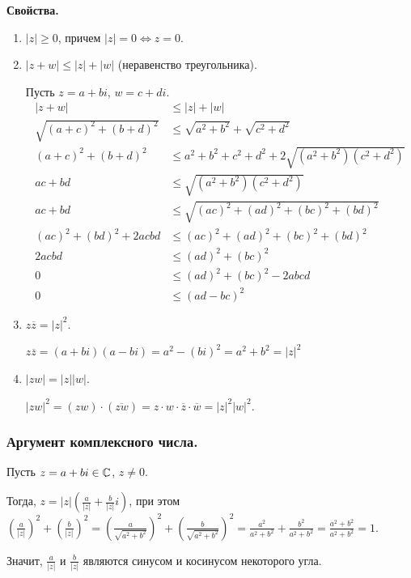 \textbf{Свойства.}

\begin{enumerate}[label={\arabic*°.}]
    \item $|z| \geq 0$, причем $|z| = 0 \iff z = 0$.
    \item $|z + w| \leq |z| + |w|$ (неравенство треугольника).

    Пусть $z = a + bi$, $w = c + di$.
    \begin{align*}
        |z + w| &\leq |z| + |w| \\
        \sqrt{(a + c)^2 + (b + d)^2} &\leq \sqrt{a^2 + b^2} + \sqrt{c^2 + d^2} \\
        (a + c)^2 + (b + d)^2 &\leq a^2 + b^2 + c^2 + d^2 + 2\sqrt{(a^2 + b^2)(c^2 + d^2)} \\
        ac + bd &\leq\sqrt{(a^2 + b^2)(c^2 + d^2)} \\
        ac + bd &\leq\sqrt{(ac)^2 + (ad)^2 + (bc)^2 + (bd)^2} \\
        (ac)^2 + (bd)^2 + 2acbd &\leq (ac)^2 + (ad)^2 + (bc)^2 + (bd)^2 \\
        2acbd &\leq (ad)^2 + (bc)^2 \\
        0 &\leq (ad)^2 + (bc)^2 - 2abcd \\
        0 &\leq (ad - bc)^2
    \end{align*}
    \item $z \overline{z} = |z|^2$.

    $z \overline{z} = (a + bi)(a - bi) = a^2 - (bi)^2 = a^2 + b^2 = |z|^2$
    \item $|zw| = |z||w|$.

    $|zw|^2 = (zw) \cdot (\overline{zw}) = z \cdot w \cdot \overline{z} \cdot \overline{w} = |z|^2 |w|^2$.
\end{enumerate}


\newpage


\subsubsection{
    Аргумент комплексного числа.
}

Пусть $z = a + bi \in \mathbb{C}$, $z \neq 0$.

Тогда, $z = |z| \left(\frac{a}{|z|} + \frac{b}{|z|}i\right)$, при этом $\left(\frac{a}{|z|}\right)^2 + \left(\frac{b}{|z|}\right)^2 = (\frac{a}{\sqrt{a^2 + b^2}})^2 + (\frac{b}{\sqrt{a^2 + b^2}})^2 = \frac{a^2}{a^2 + b^2} + \frac{b^2}{a^2 + b^2} = \frac{a^2 + b^2}{a^2 + b^2} = 1.$

Значит, $\frac{a}{|z|}$ и $\frac{b}{|z|}$ являются синусом и косинусом некоторого угла.

